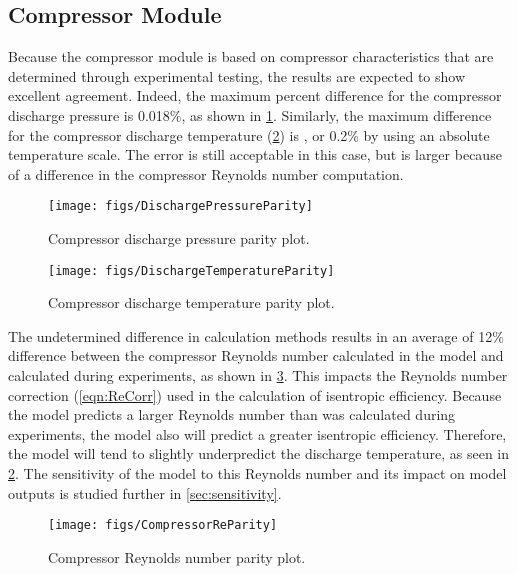 \subsection{Compressor Module} \label{sec:CompResults}
Because the compressor module is based on compressor
characteristics that are determined through experimental testing, 
the results are expected to show excellent agreement.
Indeed, the maximum percent difference for the compressor discharge pressure is 0.018\%,
as shown in \cref{fig:DischargePressureParity}.
Similarly, the maximum difference for the compressor discharge temperature 
(\cref{fig:DischargeTemperatureParity}) is , or 0.2\% by using an absolute temperature scale.
The error is still acceptable in this case, but is larger because of a difference
in the compressor Reynolds number computation.
\begin{figure}[tbp]
  \centering
  \texttt{[image: figs/DischargePressureParity]}
  \caption{Compressor discharge pressure parity plot.}
  \label{fig:DischargePressureParity}
\end{figure}
\begin{figure}[tbp]
  \centering
  \texttt{[image: figs/DischargeTemperatureParity]}
  \caption{Compressor discharge temperature parity plot.}
  \label{fig:DischargeTemperatureParity}
\end{figure}

The undetermined difference in calculation methods results in an average of 12\%
difference between the compressor Reynolds number calculated in the model and calculated during experiments,
as shown in \cref{fig:CompReParity}.
This impacts the Reynolds number correction (\cref{eqn:ReCorr}) used
in the calculation of isentropic efficiency.
Because the model predicts a larger Reynolds number than was calculated during
experiments, the model also will predict a greater isentropic efficiency.
Therefore, the model will tend to slightly underpredict the
discharge temperature, as seen in \cref{fig:DischargeTemperatureParity}.
The sensitivity of the model to this Reynolds number and its impact on
model outputs is studied further in \cref{sec:sensitivity}.
\begin{figure}[tbp]
  \centering
  \texttt{[image: figs/CompressorReParity]}
  \caption{Compressor Reynolds number parity plot.}
  \label{fig:CompReParity}
\end{figure}

